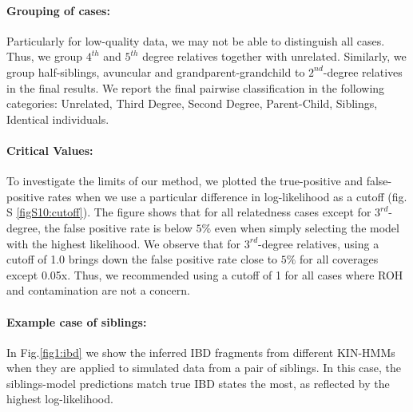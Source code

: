 \documentclass[12pt, letterpaper]{article}
\begin{document}
\paragraph{Grouping of cases:}
Particularly for low-quality data, we may not be able to distinguish all cases. Thus, we group $4^{th}$ and $5^{th}$ degree relatives together with unrelated. Similarly, we group  half-siblings, avuncular and grandparent-grandchild to  $2^{nd}$-degree relatives in the final results. We report the final pairwise classification in the following categories: Unrelated, Third Degree, Second Degree, Parent-Child, Siblings, Identical individuals.


\paragraph{Critical Values:}
 
To investigate the limits of our method, we plotted the true-positive and false-positive rates when we use a particular difference in log-likelihood as a cutoff (fig. S \ref{figS10:cutoff}). The figure shows that for all relatedness cases except for $3^{rd}$-degree, the false positive rate is below $5\%$ even when simply selecting the model with the highest likelihood. We observe that for $3^{rd}$-degree relatives, using a cutoff of 1.0 brings down the false positive rate close to $5\%$ for all coverages except 0.05x. Thus, we  recommended using a cutoff of 1 for all cases where ROH and contamination are not a concern.


\paragraph{Example case of siblings:}
In Fig.\ref{fig1:ibd} we show the inferred IBD fragments from different KIN-HMMs when they are applied to simulated data from a pair of siblings. In this case, the siblings-model predictions match true IBD states the most, as reflected by the highest log-likelihood. 
\end{document}
